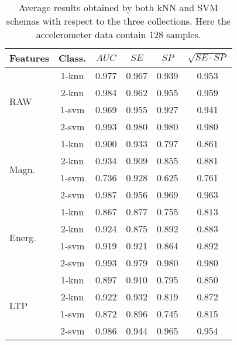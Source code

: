 \documentclass[twocolumn]{svjour3}          \smartqed  \usepackage[draft]{hyperref}
\begin{document}
 
 \begin{table}[tb]
\scriptsize
\centering
\begin{tabular}{lccccc}
	Features&Class.	&	$AUC$ &	$SE$ &	$SP$	&	$\sqrt{SE\cdot SP}$ \\
\hline \multirow{4}{*}{RAW}	&1-knn&	0.977&	0.967&	0.939&	0.953\\ 
&2-knn&	0.984&	0.962&	0.955&	0.959\\ 
&1-svm&	0.969&	0.955&	0.927&	0.941\\ 
&2-svm&	0.993&	0.980&	0.980&	0.980\\ 
[2pt] 
\hline 
\multirow{4}{*}{Magn.}	&1-knn&	0.900&	0.933&	0.797&	0.861\\ 
&2-knn&	0.934&	0.909&	0.855&	0.881\\ 
&1-svm&	0.736&	0.928&	0.625&	0.761\\ 
&2-svm&	0.987&	0.956&	0.969&	0.963\\ 
[2pt] 
\hline 
\multirow{4}{*}{Energ.}	&1-knn&	0.867&	0.877&	0.755&	0.813\\ 
&2-knn&	0.924&	0.875&	0.892&	0.883\\ 
&1-svm&	0.919&	0.921&	0.864&	0.892\\ 
&2-svm&	0.993&	0.979&	0.980&	0.980\\ 
[2pt] 
\hline 
\multirow{4}{*}{LTP}	&1-knn&	0.897&	0.910&	0.795&	0.850\\ 
&2-knn&	0.922&	0.932&	0.819&	0.872\\ 
&1-svm&	0.872&	0.896&	0.745&	0.815\\ 
&2-svm&	0.986&	0.944&	0.965&	0.954\\ 
[2pt] 
\hline  
\end{tabular}
\medskip
\caption{Average results obtained by both kNN and SVM schemas with respect to the three collections. Here the accelerometer data contain 128 samples.}
\label{table:summary-1-128}
 \end{table}
 
\end{document}
